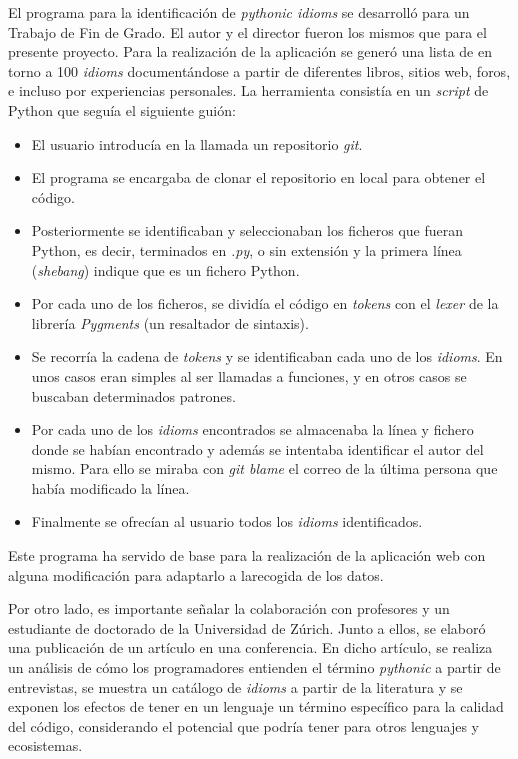 \documentclass[a4paper, 12pt]{book}
\begin{document}
El programa para la identificación de \textit{pythonic idioms} se desarrolló para un Trabajo de Fin de Grado. El autor y el director fueron los mismos que para el presente proyecto. Para la realización de la aplicación se generó una lista de en torno a 100 \textit{idioms} documentándose a partir de diferentes libros, sitios web, foros, e incluso por experiencias personales. La herramienta consistía en un \textit{script} de Python que seguía el siguiente guión:
\begin{itemize}
    \item El usuario introducía en la llamada un repositorio \textit{git}.
    \item El programa se encargaba de clonar el repositorio en local para obtener el código.
    \item Posteriormente se identificaban y seleccionaban los ficheros que fueran Python, es decir, terminados en \textit{.py}, o sin extensión y la primera línea (\textit{shebang}) indique que es un fichero Python.
    \item Por cada uno de los ficheros, se dividía el código en \textit{tokens} con el \textit{lexer} de la librería \textit{Pygments} (un resaltador de sintaxis).
    \item Se recorría la cadena de \textit{tokens} y se identificaban cada uno de los \textit{idioms}. En unos casos eran simples al ser llamadas a funciones, y en otros casos se buscaban determinados patrones.
    \item Por cada uno de los \textit{idioms} encontrados se almacenaba la línea y fichero donde se habían encontrado y además se intentaba identificar el autor del mismo. Para ello se miraba con \textit{git blame} el correo de la última persona que había modificado la línea.
    \item Finalmente se ofrecían al usuario todos los \textit{idioms} identificados.
\end{itemize}

Este programa ha servido de base para la realización de la aplicación web con alguna modificación para adaptarlo a larecogida de los datos.

Por otro lado, es importante señalar la colaboración con profesores y un estudiante de doctorado de la Universidad de Zúrich. Junto a ellos, se elaboró una publicación de un artículo en una conferencia. En dicho artículo, se realiza un análisis de cómo los programadores entienden el término \textit{pythonic} a partir de entrevistas, se muestra un catálogo de \textit{idioms} a partir de la literatura y se exponen los efectos de tener en un lenguaje un término específico para la calidad del código, considerando el potencial que podría tener para otros lenguajes y ecosistemas\cite{pythononroad}.
\end{document}
